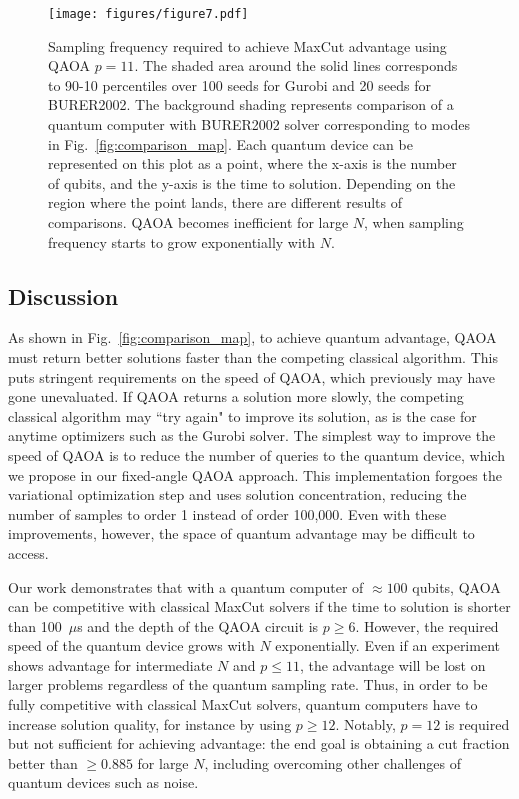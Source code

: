 \documentclass[prb,reprint,nofootinbib,longbibliography,superscriptaddress]{revtex4-1}
\begin{document}
\begin{figure}
    \centering
    \texttt{[image: figures/figure7.pdf]}
    \caption{
    Sampling frequency required to achieve MaxCut advantage using QAOA $p=11$.
    The shaded area around the solid lines corresponds to 90-10 percentiles over 100 seeds for Gurobi and 20 seeds for BURER2002.
    The background shading represents comparison of a quantum computer with BURER2002 solver corresponding to modes in Fig.~\ref{fig:comparison_map}.
    Each quantum device can be represented on this plot as a point, where the x-axis is the number of qubits, and the y-axis is the time to solution. 
    Depending on the region where the point lands, there are different results of comparisons.
    QAOA becomes inefficient for large $N$, when sampling frequency starts to grow exponentially with $N$.
    }
    \label{fig:adv_rate}
\end{figure}





\subsection{Discussion}

As shown in Fig.~\ref{fig:comparison_map}, to achieve quantum advantage, QAOA must return better solutions faster than the competing classical algorithm. This puts stringent requirements on the speed of QAOA, which previously may have gone unevaluated. If QAOA returns a solution more slowly, the competing classical algorithm may ``try again" to improve its solution, as is the case for anytime optimizers such as the Gurobi solver. The simplest way to improve the speed of QAOA is to reduce the number of queries to the quantum device, which we propose in our fixed-angle QAOA approach. This implementation forgoes the variational optimization step and uses solution concentration, reducing the number of samples to order 1 instead of order 100,000. Even with these improvements, however, the space of quantum advantage may be difficult to access.

Our work demonstrates that with a quantum computer of $\approx 100$ qubits, QAOA can be competitive with classical MaxCut solvers if the time to solution is shorter than 100~$\mu$s and the depth of the QAOA circuit is $p\geq6$.
However, the required speed of the quantum device grows with $N$ exponentially. Even if an experiment shows advantage for intermediate $N$ and $p\leq11$, the advantage will be lost on larger problems regardless of the quantum sampling rate. 
Thus, in  order  to be fully competitive with classical MaxCut solvers, quantum computers have to increase solution quality, for instance by using $p\geq12$.
Notably, $p=12$ is required but not sufficient for achieving advantage: the end goal is obtaining a cut fraction better than $\geq 0.885$ for large $N$, including overcoming other challenges of quantum devices such as noise.
\end{document}
